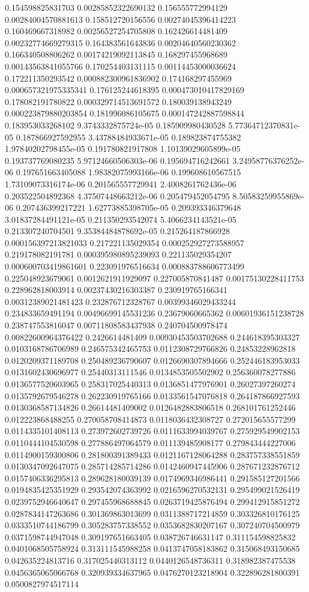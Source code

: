 \begin{table}
\begin{tabu}
\begin{sparkline}{10}
0.154598825831703 0.00285852322690132 0.156555772994129 0.00284004570881613 0.158512720156556 0.00274045396414223 0.160469667318982 0.00256527254705808 0.162426614481409 0.00232774669279315 0.164383561643836 0.00204640560230362 0.166340508806262 0.00174219092113845 0.168297455968689 0.00143563841055766 0.170254403131115 0.00114453000036624 0.172211350293542 0.000882300961836902 0.174168297455969 0.000657321975335341 0.176125244618395 0.000473010417829169 0.178082191780822 0.000329714513691572 0.180039138943249 0.000223879880203854 0.181996086105675 0.000147242887598844 0.183953033268102 9.3743332875724e-05 0.185909980430528 5.77364712370831e-05 0.187866927592955 3.43788484933671e-05 0.189823874755382 1.97840202798455e-05 0.191780821917808 1.10139029605899e-05 0.193737769080235 5.97124660506303e-06 0.195694716242661 3.24958776376252e-06 0.197651663405088 1.98382075993166e-06 0.199608610567515 1.73109073316174e-06 0.201565557729941 2.4008261762436e-06 0.203522504892368 4.37507448663212e-06 0.205479452054795 8.50583259955869e-06 0.207436399217221 1.62773885398705e-05 0.209393346379648 3.01837284491121e-05 0.211350293542074 5.4066234143521e-05 0.213307240704501 9.35384484878692e-05 0.215264187866928 0.000156397213821033 0.217221135029354 0.000252927273588957 0.219178082191781 0.000395980895239093 0.221135029354207 0.000600703419861601 0.223091976516634 0.000883788606773499 0.225048923679061 0.0012621911929097 0.227005870841487 0.00175130228411753 0.228962818003914 0.00237430216303387 0.230919765166341 0.00312389021481423 0.232876712328767 0.00399346029433244 0.234833659491194 0.00496699145531236 0.23679060665362 0.00601936151238728 0.238747553816047 0.00711808583437938 0.240704500978474 0.00822600964376422 0.2426614481409 0.00930453503702688 0.244618395303327 0.0103168786706989 0.246575342465753 0.0112308729766826 0.24853228962818 0.0120209371189708 0.250489236790607 0.0126690307894666 0.252446183953033 0.0131602430696977 0.25440313111546 0.0134853505502902 0.256360078277886 0.0136577520603965 0.258317025440313 0.0136851477976901 0.26027397260274 0.0135792679546278 0.262230919765166 0.0133561547076818 0.264187866927593 0.0130368587134826 0.26614481409002 0.0126482883806518 0.268101761252446 0.012223868488255 0.270058708414873 0.0118036432308727 0.272015655577299 0.0114335101408113 0.273972602739726 0.0111633994039767 0.275929549902153 0.0110444104530598 0.277886497064579 0.011139485908177 0.279843444227006 0.0114900159300806 0.281800391389433 0.0121167128064288 0.283757338551859 0.0130347092647075 0.285714285714286 0.0142460947445906 0.287671232876712 0.0157406336295813 0.289628180039139 0.0174969346986441 0.291585127201566 0.0194835425351929 0.293542074363992 0.0216596270532131 0.295499021526419 0.0239752946640647 0.297455968688845 0.0263719425876494 0.299412915851272 0.0287834147263686 0.301369863013699 0.0311388717214859 0.303326810176125 0.0333510744186799 0.305283757338552 0.0353682830207167 0.307240704500979 0.0371598744947048 0.309197651663405 0.038726746631147 0.311154598825832 0.0401068505758924 0.313111545988258 0.0413747058183862 0.315068493150685 0.042635224813716 0.317025440313112 0.0440126548736311 0.318982387475538 0.0456365065066768 0.320939334637965 0.0476270123218904 0.322896281800391 0.0500827974517114 
\end{sparkline}
\end{tabu}
\end{table}

